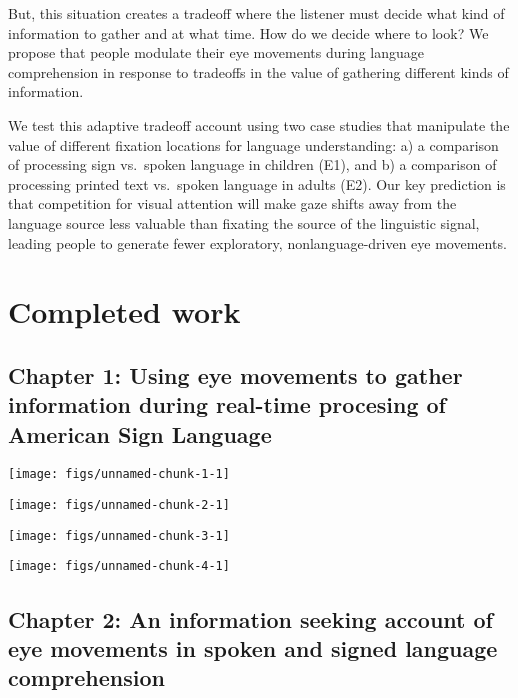 \documentclass[]{elsarticle} %
\begin{document}
But, this situation creates a tradeoff where the listener must decide
what kind of information to gather and at what time. How do we decide
where to look? We propose that people modulate their eye movements
during language comprehension in response to tradeoffs in the value of
gathering different kinds of information.

We test this adaptive tradeoff account using two case studies that
manipulate the value of different fixation locations for language
understanding: a) a comparison of processing sign vs.~spoken language in
children (E1), and b) a comparison of processing printed text vs.~spoken
language in adults (E2). Our key prediction is that competition for
visual attention will make gaze shifts away from the language source
less valuable than fixating the source of the linguistic signal, leading
people to generate fewer exploratory, nonlanguage-driven eye movements.

\section{Completed work}\label{completed-work}

\hypertarget{ch1}{\subsection{Chapter 1: Using eye movements to gather
information during real-time procesing of American Sign
Language}\label{ch1}}

\begin{center}\texttt{[image: figs/unnamed-chunk-1-1]} \end{center}

\begin{center}\texttt{[image: figs/unnamed-chunk-2-1]} \end{center}

\begin{center}\texttt{[image: figs/unnamed-chunk-3-1]} \end{center}

\begin{center}\texttt{[image: figs/unnamed-chunk-4-1]} \end{center}

\subsection{Chapter 2: An information seeking account of eye movements
in spoken and signed language comprehension}\label{ch2}
\end{document}
